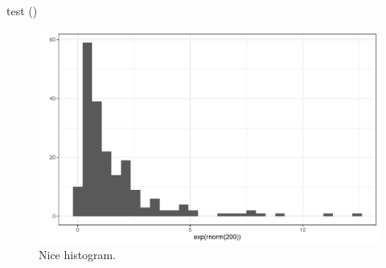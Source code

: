 \documentclass[11pt,ngerman,a4paper,]{article}
\begin{document}
test (\cite{hasani2021liquid})

\singlespacing

\begin{figure}
\centering
\includegraphics{examination_files/figure-latex/histogram-1.pdf}
\caption{\label{fig:histogram}Nice histogram.}
\end{figure}

\newpage
\printbibliography
\end{document}
